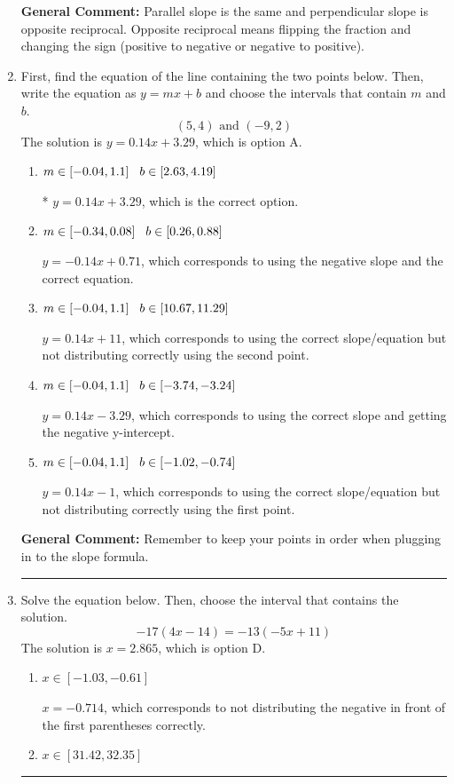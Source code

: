 \documentclass{extbook}[14pt]
\newcommand{\litem}[1]{\item #1

\rule{\textwidth}{0.4pt}}
\begin{document}
\begin{enumerate}
{\textbf{General Comment:} Parallel slope is the same and perpendicular slope is opposite reciprocal. Opposite reciprocal means flipping the fraction and changing the sign (positive to negative or negative to positive).
}
\litem{
First, find the equation of the line containing the two points below. Then, write the equation as $ y=mx+b $ and choose the intervals that contain $m$ and $b$.
\[ (5, 4) \text{ and } (-9, 2) \]
The solution is \( y = 0.14x + 3.29 \), which is option A.\begin{enumerate}[label=\Alph*.]
\item \( m \in [-0.04, 1.1] \hspace*{3mm} b \in [2.63, 4.19] \)

* $y = 0.14x + 3.29$, which is the correct option.
\item \( m \in [-0.34, 0.08] \hspace*{3mm} b \in [0.26, 0.88] \)

 $y = -0.14x + 0.71$, which corresponds to using the negative slope and the correct equation.
\item \( m \in [-0.04, 1.1] \hspace*{3mm} b \in [10.67, 11.29] \)

 $y = 0.14x + 11$, which corresponds to using the correct slope/equation but not distributing correctly using the second point.
\item \( m \in [-0.04, 1.1] \hspace*{3mm} b \in [-3.74, -3.24] \)

 $y = 0.14x -3.29$, which corresponds to using the correct slope and getting the negative y-intercept.
\item \( m \in [-0.04, 1.1] \hspace*{3mm} b \in [-1.02, -0.74] \)

 $y = 0.14x -1$, which corresponds to using the correct slope/equation but not distributing correctly using the first point.
\end{enumerate}

\textbf{General Comment:} Remember to keep your points in order when plugging in to the slope formula.
}
\litem{
Solve the equation below. Then, choose the interval that contains the solution.
\[ -17(4x -14) = -13(-5x + 11) \]
The solution is \( x = 2.865 \), which is option D.\begin{enumerate}[label=\Alph*.]
\item \( x \in [-1.03, -0.61] \)

$x = -0.714$, which corresponds to not distributing the negative in front of the first parentheses correctly.
\item \( x \in [31.42, 32.35] \)


\end{enumerate}}
\end{enumerate}
\end{document}
